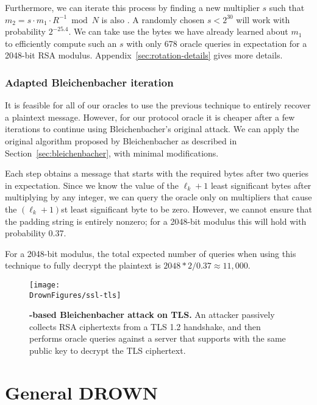 Furthermore, we can iterate this process by finding a new multiplier $s$ such that $m_2 = s \cdot m_1 \cdot R^{-1} \bmod N$ is also \sslconform.  A randomly chosen $s < 2^{30}$ will work with probability $2^{-25.4}$.  We can take use the bytes we have already learned about $m_1$ to efficiently compute such an $s$ with only 678 oracle queries in expectation for a 2048-bit RSA modulus.   Appendix~\ref{sec:rotation-details} gives more details.

\subsubsection{Adapted Bleichenbacher iteration}
\label{sec:bb-iteration}
It is feasible for all of our oracles to use the previous technique to entirely recover a plaintext message.  However, for our \ssltwo protocol oracle it is cheaper after a few iterations to continue using Bleichenbacher's original attack.  We can apply the original algorithm proposed by Bleichenbacher as described in Section~\ref{sec:bleichenbacher}\ifext, with minimal modifications\fi.

Each step obtains a message that starts with the required  bytes after two queries in expectation.
Since we know the value of the $\ell_k+1$ least significant bytes after multiplying by any integer, we can query the oracle only on multipliers that cause the $(\ell_k+1)$st least significant byte to be zero.  However, we cannot ensure that the padding string is entirely nonzero; for a 2048-bit modulus this will hold with probability 0.37.

For a 2048-bit modulus, the total expected number of queries when using this technique to fully decrypt the plaintext is $2048 * 2 / 0.37 \approx 11,000$.


\begin{figure}[t]
	\texttt{[image: \\DrownFigures/ssl-tls]} 
	\caption{\textbf{\ssltwo-based Bleichenbacher attack on TLS\@.} An attacker passively collects RSA ciphertexts from a TLS 1.2 handshake, and then performs oracle queries against a server that supports \ssltwo with the same public key to decrypt the TLS ciphertext.}
	\label{fig:ssl-tls}
\end{figure}

\section{General DROWN} 
\label{vulnerability}

